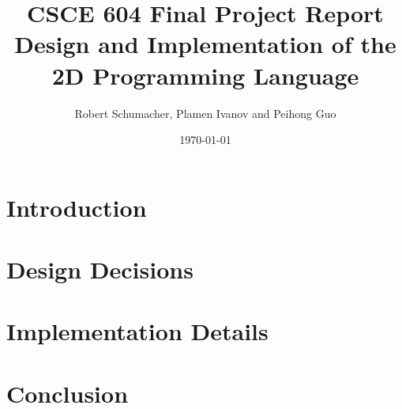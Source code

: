 \documentclass[12pt,UTF8,a4]{article}
\title{CSCE 604 Final Project Report \\ Design and Implementation of the 2D Programming Language}
\author{Robert Schumacher, Plamen Ivanov and Peihong Guo}
\date{\today}
\begin{document}
\maketitle
\singlespacing

\section{Introduction}
\section{Design Decisions}
\section{Implementation Details}
\section{Conclusion}
\end{document}
